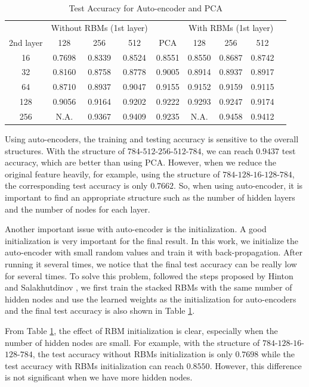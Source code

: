 \documentclass[tikz, multi,dvipsnames,svgnames,x11names]{article}
\begin{document}
\begin{table}[htb]
	\centering
	\caption{Test Accuracy for Auto-encoder and PCA}
	\label{table:test_acc_auto}	
	\begin{tabular}{c c c c c c c c c}
		\hline \hline
		 & \multicolumn{3}{c}{Without RBMs (1st layer)} &  & \multicolumn{3}{c}{With RBMs (1st layer)}\\
		\cline{2-4} \cline{6-8}
    2nd layer  &	128    & 256 	& 512    & PCA 	  & 128    & 256 	& 512    \\[0.1cm]
		\hline
		16     &	0.7698 & 0.8339 & 0.8524 & 0.8551 & 0.8550 & 0.8687 & 0.8742 \\[0.1cm]
		32	   &	0.8160 & 0.8758 & 0.8778 & 0.9005 & 0.8914 & 0.8937 & 0.8917 \\[0.1cm]
		64	   &	0.8710 & 0.8937 & 0.9047 & 0.9155 & 0.9152 & 0.9159 & 0.9115 \\[0.1cm]
		128	   &	0.9056 & 0.9164 & 0.9202 & 0.9222 & 0.9293 & 0.9247 & 0.9174 \\[0.1cm]
		256    &	N.A.   & 0.9367 & 0.9409 & 0.9235 & N.A.   & 0.9458 & 0.9412 \\[0.1cm]
		\hline	
	\end{tabular}
\end{table}

Using auto-encoders, the training and testing accuracy is sensitive to the overall structures. With the structure of $784$-$512$-$256$-$512$-$784$, we can reach $0.9437$ test accuracy, which are better than using PCA. However, when we reduce the original feature heavily, for example, using the structure of $784$-$128$-$16$-$128$-$784$, the corresponding test accuracy is only $0.7662$. So, when using auto-encoder, it is important to find an appropriate structure such as the number of hidden layers and the number of nodes for each layer.

Another important issue with auto-encoder is the initialization. A good initialization is very important for the final result. In this work, we initialize the auto-encoder with small random values and train it with back-propagation. After running it several times, we notice that the final test accuracy can be really low for several times. To solve this problem, followed the steps proposed by Hinton and Salakhutdinov \cite{hinton2006reducing}, we first train the stacked RBMs with the same number of hidden nodes and use the learned weights as the initialization for auto-encoders and the final test accuracy is also shown in Table \ref{table:test_acc_auto}.

From Table \ref{table:test_acc_auto}, the effect of RBM initialization is clear, especially when the number of hidden nodes are small. For example, with the structure of $784$-$128$-$16$-$128$-$784$, the test accuracy without RBMs initialization is only $0.7698$ while the test accuracy with RBMs initialization can reach $0.8550$. However, this difference is not significant when we have more hidden nodes.
\end{document}
